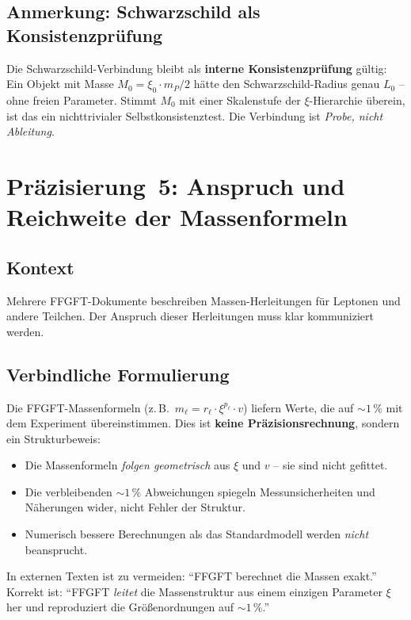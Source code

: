 \subsection*{Anmerkung: Schwarzschild als Konsistenzprüfung}

Die Schwarzschild-Verbindung bleibt als \textbf{interne Konsistenzprüfung} gültig:
Ein Objekt mit Masse $M_0 = \xi_0 \cdot m_P / 2$ hätte den Schwarzschild-Radius
genau $L_0$ -- ohne freien Parameter. Stimmt $M_0$ mit einer Skalenstufe der
$\xi$-Hierarchie überein, ist das ein nichttrivialer Selbstkonsistenztest.
Die Verbindung ist \emph{Probe, nicht Ableitung}.

\section{Präzisierung~5: Anspruch und Reichweite der Massenformeln}

\subsection*{Kontext}

Mehrere FFGFT-Dokumente beschreiben Massen-Herleitungen für Leptonen
und andere Teilchen. Der Anspruch dieser Herleitungen muss klar
kommuniziert werden.

\subsection*{Verbindliche Formulierung}

Die FFGFT-Massenformeln (z.\,B.\ $m_\ell = r_\ell \cdot \xi^{p_\ell} \cdot v$)
liefern Werte, die auf $\sim 1\,\%$ mit dem Experiment übereinstimmen.
Dies ist \textbf{keine Präzisionsrechnung}, sondern ein Strukturbeweis:

\begin{itemize}
  \item Die Massenformeln \emph{folgen geometrisch} aus $\xi$ und $v$
    -- sie sind nicht gefittet.
  \item Die verbleibenden $\sim 1\,\%$ Abweichungen spiegeln
    Messunsicherheiten und Näherungen wider, nicht Fehler der Struktur.
  \item Numerisch bessere Berechnungen als das Standardmodell werden
    \emph{nicht} beansprucht.
\end{itemize}

In externen Texten ist zu vermeiden: \enquote{FFGFT berechnet die Massen exakt.}
Korrekt ist: \enquote{FFGFT \emph{leitet} die Massenstruktur aus einem einzigen
Parameter $\xi$ her und reproduziert die Größenordnungen auf $\sim 1\,\%$.}

